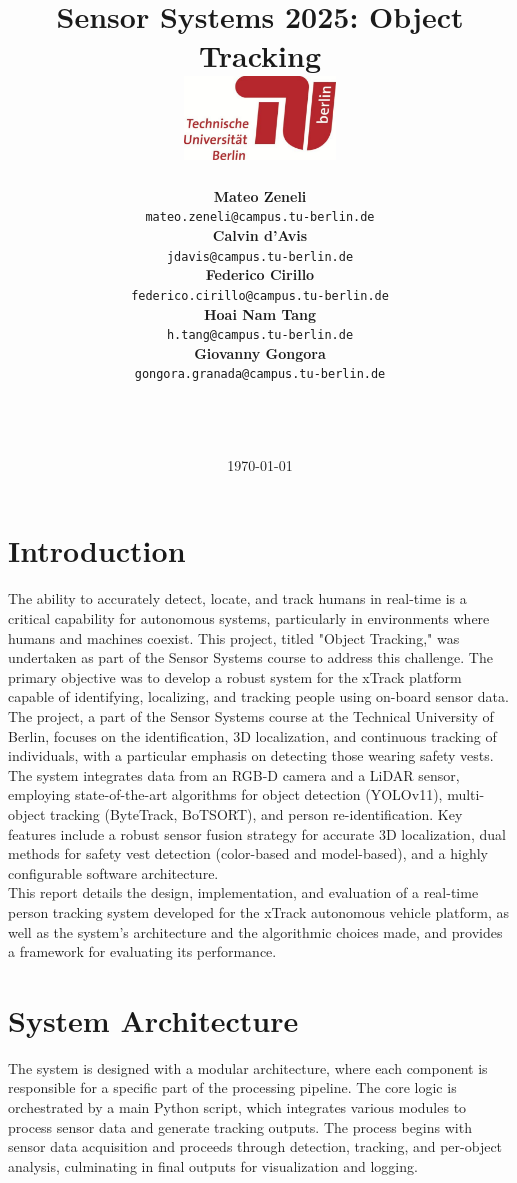 \documentclass[11pt, a4paper]{article}
\title{
    \textbf{Sensor Systems 2025: Object Tracking} \\[3.5cm]
    \includegraphics[width=0.3\textwidth]{logo.jpg} %
    \\[2.5cm]
}
\author{
\begin{minipage}{0.45\linewidth}
    \centering
    \textbf{Mateo Zeneli} \\
    \texttt{mateo.zeneli@campus.tu-berlin.de} \\[1em]
    \textbf{Calvin d'Avis} \\
    \texttt{jdavis@campus.tu-berlin.de} \\[1em]
    \textbf{Federico Cirillo} \\
    \texttt{federico.cirillo@campus.tu-berlin.de}
\end{minipage}
\hfill
\begin{minipage}{0.45\linewidth}
    \centering
    \textbf{Hoai Nam Tang} \\
    \texttt{h.tang@campus.tu-berlin.de} \\[1em]
    \textbf{Giovanny Gongora} \\
    \texttt{gongora.granada@campus.tu-berlin.de} \\[1em]
    \textbf{ } \\
    \texttt{ }
\end{minipage}
\\[2cm]
\vfill %
}
\date{\today}
\begin{document}
\maketitle
\newpage

\tableofcontents
\newpage

\section{Introduction}
The ability to accurately detect, locate, and track humans in real-time is a critical capability for autonomous systems, particularly in environments where humans and machines coexist. This project, titled "Object Tracking," was undertaken as part of the Sensor Systems course to address this challenge. The primary objective was to develop a robust system for the xTrack platform capable of identifying, localizing, and tracking people using on-board sensor data.\\

The project, a part of the Sensor Systems course at the Technical University of Berlin, focuses on the identification, 3D localization, and continuous tracking of individuals, with a particular emphasis on detecting those wearing safety vests. The system integrates data from an RGB-D camera and a LiDAR sensor, employing state-of-the-art algorithms for object detection (YOLOv11), multi-object tracking (ByteTrack, BoTSORT), and person re-identification. Key features include a robust sensor fusion strategy for accurate 3D localization, dual methods for safety vest detection (color-based and model-based), and a highly configurable software architecture.\\

This report details the design, implementation, and evaluation of a real-time person tracking system developed for the xTrack autonomous vehicle platform, as well as the system's architecture and the algorithmic choices made, and provides a framework for evaluating its performance.

\section{System Architecture}
The system is designed with a modular architecture, where each component is responsible for a specific part of the processing pipeline. The core logic is orchestrated by a main Python script, which integrates various modules to process sensor data and generate tracking outputs. The process begins with sensor data acquisition and proceeds through detection, tracking, and per-object analysis, culminating in final outputs for visualization and logging.\\
\end{document}
